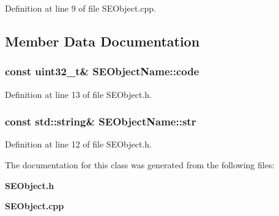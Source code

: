Definition at line 9 of file S\+E\+Object.\+cpp.



\subsection{Member Data Documentation}
\subsubsection[{code}]{\setlength{\rightskip}{0pt plus 5cm}const uint32\+\_\+t\& S\+E\+Object\+Name\+::code}\label{class_s_e_object_name_afcb51ac678884f95c542dc39ffed6450}


Definition at line 13 of file S\+E\+Object.\+h.

\subsubsection[{str}]{\setlength{\rightskip}{0pt plus 5cm}const std\+::string\& S\+E\+Object\+Name\+::str}\label{class_s_e_object_name_aedf4a513c7c12f9c85cfb627299a051a}


Definition at line 12 of file S\+E\+Object.\+h.



The documentation for this class was generated from the following files\+:\begin{DoxyCompactItemize}
\item 
{\bf S\+E\+Object.\+h}\item 
{\bf S\+E\+Object.\+cpp}\end{DoxyCompactItemize}
